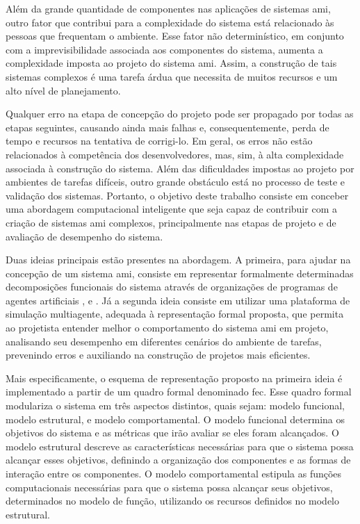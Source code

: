     Além da grande quantidade de componentes nas aplicações de sistemas \acrshort{ami}, outro fator que contribui para a complexidade do sistema está relacionado às pessoas que frequentam o ambiente. Esse fator não determinístico, em conjunto com a imprevisibilidade associada aos componentes do sistema, aumenta a complexidade imposta ao projeto do sistema \acrshort{ami}. Assim, a construção de tais sistemas complexos é uma tarefa árdua que necessita de muitos recursos e um alto nível de planejamento. 
    
    Qualquer erro na etapa de concepção do projeto pode ser propagado por todas as etapas seguintes, causando ainda mais falhas e, consequentemente, perda de tempo e recursos na tentativa de corrigi-lo. Em geral, os erros não estão relacionados à competência dos desenvolvedores, mas, sim, à alta complexidade associada à construção do sistema. Além das dificuldades impostas ao projeto por ambientes de tarefas difíceis, outro grande obstáculo está no processo de teste e validação dos sistemas. Portanto, o objetivo deste trabalho consiste em conceber uma abordagem computacional inteligente que seja capaz de contribuir com a criação de sistemas \acrshort{ami} complexos, principalmente nas etapas de projeto e de avaliação de desempenho do sistema.
    
    Duas ideias principais estão presentes na abordagem. A primeira, para ajudar na concepção de um sistema \acrshort{ami}, consiste em representar formalmente determinadas decomposições funcionais do sistema  através de organizações de programas de agentes artificiais ,  e . Já a segunda ideia consiste em utilizar uma plataforma de simulação multiagente, adequada à representação formal proposta, que permita ao projetista entender melhor o comportamento do sistema \acrshort{ami} em projeto, analisando seu desempenho em diferentes cenários do ambiente de tarefas, prevenindo erros e auxiliando na construção de projetos mais eficientes.
    
    Mais especificamente, o esquema de representação proposto na primeira ideia é implementado a partir de um quadro formal denominado \acrshort{fec}. Esse quadro formal modulariza o sistema em três aspectos distintos, quais sejam: modelo funcional, modelo estrutural, e modelo comportamental. O modelo funcional determina os objetivos do sistema e as métricas que irão avaliar se eles foram alcançados. O modelo estrutural descreve as características necessárias para que o sistema possa alcançar esses objetivos, definindo a organização dos componentes e as formas de interação entre os componentes. O modelo comportamental estipula as funções computacionais necessárias para que o sistema possa alcançar seus objetivos, determinados no modelo de função, utilizando os recursos definidos no modelo estrutural. 
    
